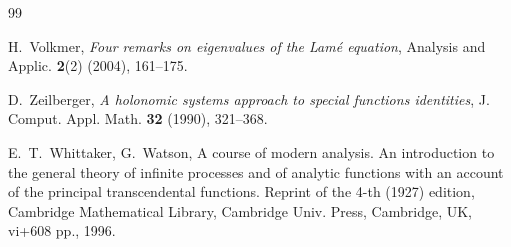 \documentclass[10pt,twoside,a4paper,reqno]{amsart}
\theoremstyle{plain}
\theoremstyle{definition}
\theoremstyle{remark}
\begin{document}
\begin{thebibliography}{99}


H.~Volkmer, {\em Four remarks on eigenvalues of the Lam\'e equation}, 
Analysis and Applic. {\bf 2}(2) (2004), 161--175. 


D.~Zeilberger,
{\em A holonomic systems approach to special functions identities},
J. Comput. Appl. Math. {\bf 32} (1990), 321--368.

E.~T.~Whittaker, G.~Watson,  A course of modern analysis. An introduction to 
the general theory of infinite processes and of analytic functions 
with an account of the principal transcendental functions. Reprint of the 
4-th (1927) edition, Cambridge Mathematical Library, Cambridge Univ. Press, 
Cambridge, UK, vi+608 pp., 1996. 

\end{thebibliography}
\end{document}
